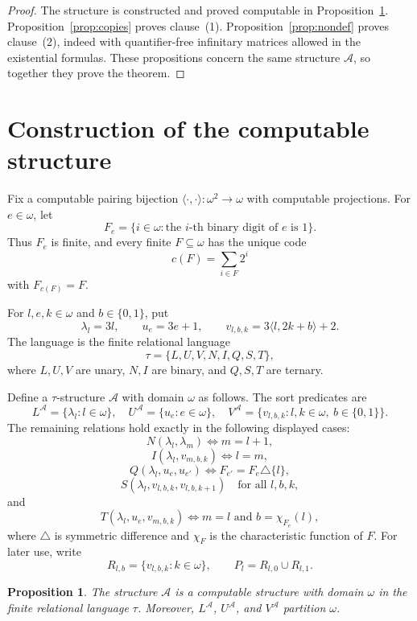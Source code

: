 \documentclass[12pt]{article}
\newtheorem{proposition}[theorem]{Proposition}
\theoremstyle{definition}
\theoremstyle{remark}
\begin{document}
\begin{proof}
The structure is constructed and proved computable in Proposition~\ref{prop:construction}.  Proposition~\ref{prop:copies} proves clause~(1).  Proposition~\ref{prop:nondef} proves clause~(2), indeed with quantifier-free infinitary matrices allowed in the existential formulas.  These propositions concern the same structure \(\mathcal A\), so together they prove the theorem.
\end{proof}

\section{Construction of the computable structure}\label{sec:construction}

Fix a computable pairing bijection \(\langle\cdot,\cdot\rangle:\omega^2\to\omega\) with computable projections.  For \(e\in\omega\), let
\[
F_e=\{i\in\omega:\text{the \(i\)-th binary digit of \(e\) is \(1\)}\}.
\]
Thus \(F_e\) is finite, and every finite \(F\subseteq\omega\) has the unique code
\[
c(F)=\sum_{i\in F}2^i
\]
with \(F_{c(F)}=F\).

For \(l,e,k\in\omega\) and \(b\in\{0,1\}\), put
\[
\lambda_l=3l,\qquad u_e=3e+1,\qquad v_{l,b,k}=3\langle l,2k+b\rangle+2.
\]
The language is the finite relational language
\[
\tau=\{L,U,V,N,I,Q,S,T\},
\]
where \(L,U,V\) are unary, \(N,I\) are binary, and \(Q,S,T\) are ternary.

Define a \(\tau\)-structure \(\mathcal A\) with domain \(\omega\) as follows.  The sort predicates are
\[
L^{\mathcal A}=\{\lambda_l:l\in\omega\},\quad
U^{\mathcal A}=\{u_e:e\in\omega\},\quad
V^{\mathcal A}=\{v_{l,b,k}:l,k\in\omega,\ b\in\{0,1\}\}.
\]
The remaining relations hold exactly in the following displayed cases:
\[
N(\lambda_l,\lambda_m)\Longleftrightarrow m=l+1,
\]
\[
I(\lambda_l,v_{m,b,k})\Longleftrightarrow l=m,
\]
\[
Q(\lambda_l,u_e,u_{e'})\Longleftrightarrow F_{e'}=F_e\triangle\{l\},
\]
\[
S(\lambda_l,v_{l,b,k},v_{l,b,k+1})
\quad\text{for all }l,b,k,
\]
and
\[
T(\lambda_l,u_e,v_{m,b,k})
\Longleftrightarrow
m=l\text{ and }b=\chi_{F_e}(l),
\]
where \(\triangle\) is symmetric difference and \(\chi_F\) is the characteristic function of \(F\).  For later use, write
\[
R_{l,b}=\{v_{l,b,k}:k\in\omega\},
\qquad
P_l=R_{l,0}\cup R_{l,1}.
\]

\begin{proposition}\label{prop:construction}
The structure \(\mathcal A\) is a computable structure with domain \(\omega\) in the finite relational language \(\tau\).  Moreover, \(L^{\mathcal A}\), \(U^{\mathcal A}\), and \(V^{\mathcal A}\) partition \(\omega\).
\end{proposition}
\end{document}
